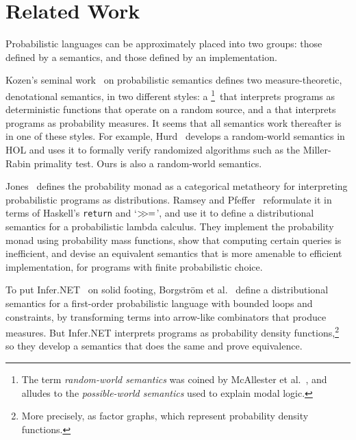 \documentclass{llncs}
\begin{document}
\section{Related Work}

Probabilistic languages can be approximately placed into two groups: those defined by a semantics, and those defined by an implementation.

\newcommand{\randomworldfootnote}{\footnote{The term \emph{random-world semantics} was coined by McAllester et al.~\cite{cit:mcallester-2008tr-random-world}, and alludes to the \emph{possible-world semantics} used to explain modal logic.}\xspace}

Kozen's seminal work~\cite{cit:kozen-1979fcs-prob-programs-short} on probabilistic semantics defines two measure-theoretic, denotational semantics, in two different styles: a \randomworldfootnote\ that interprets programs as deterministic functions that operate on a random source, and a  that interprets programs as probability measures.
It seems that all semantics work thereafter is in one of these styles.
For example, Hurd~\cite{cit:hurd-2002thesis} develops a random-world semantics in HOL and uses it to formally verify randomized algorithms such as the Miller-Rabin primality test.
Ours is also a random-world semantics.

Jones~\cite{cit:jones-1990thesis} defines the probability monad as a categorical metatheory for interpreting probabilistic programs as distributions.
Ramsey and Pfeffer~\cite{cit:ramsey-2002popl-stochastic-short} reformulate it in terms of Haskell's \texttt{return} and `${>}\mspace{-6mu}{>}\mspace{-1mu}{=}$', and use it to define a distributional semantics for a probabilistic lambda calculus.
They implement the probability monad using probability mass functions, show that computing certain queries is inefficient, and devise an equivalent semantics that is more amenable to efficient implementation, for programs with finite probabilistic choice.

\newcommand{\factorgraphfootnote}{\footnote{More precisely, as factor graphs, which represent probability density functions.}\xspace}

To put Infer.NET~\cite{cit:inferdotnet} on solid footing, Borgstr\"om et al.~\cite{cit:borgstrom-2011esop-measure-transformer} define a distributional semantics for a first-order probabilistic language with bounded loops and constraints, by transforming terms into arrow-like combinators that produce measures.
But Infer.NET interprets programs as probability density functions,\factorgraphfootnote so they develop a semantics that does the same and prove equivalence.
\end{document}
